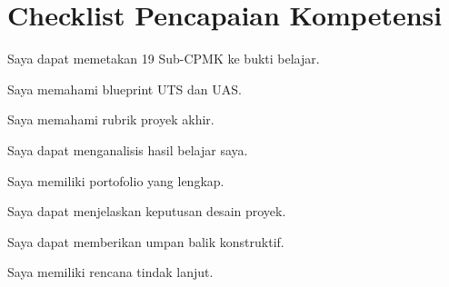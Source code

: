 \section*{Checklist Pencapaian Kompetensi}

\begin{checklist}
  \item Saya dapat memetakan 19 Sub-CPMK ke bukti belajar.
  \item Saya memahami blueprint UTS dan UAS.
  \item Saya memahami rubrik proyek akhir.
  \item Saya dapat menganalisis hasil belajar saya.
  \item Saya memiliki portofolio yang lengkap.
  \item Saya dapat menjelaskan keputusan desain proyek.
  \item Saya dapat memberikan umpan balik konstruktif.
  \item Saya memiliki rencana tindak lanjut.
\end{checklist}
